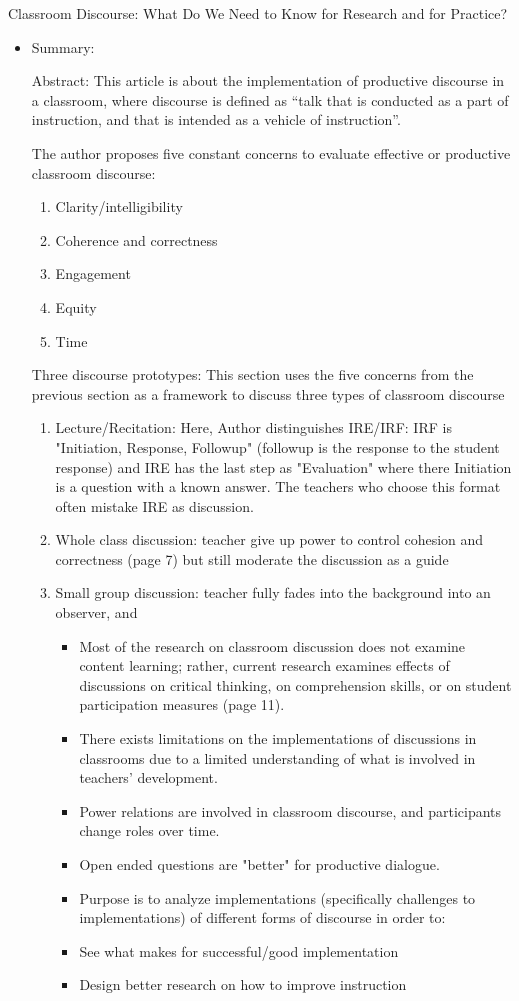 \documentclass{TC}
\begin{document}
Classroom Discourse: What Do We Need to Know for Research and for Practice? \parencite{oconnor_classroom_2017}
\begin{itemize}
\item Summary:

Abstract:
This article is about the implementation of productive discourse in a classroom, where discourse is defined as “talk that is conducted as a part of instruction, and that is intended as a vehicle of instruction”. 

The author proposes five constant concerns to evaluate effective or productive classroom discourse:
	\begin{enumerate}
	\item Clarity/intelligibility
	\item Coherence and correctness
	\item Engagement
	\item Equity
	\item Time
	\end{enumerate}
Three discourse prototypes: This section uses the five concerns from the previous section as a framework to discuss three types of classroom discourse

	\begin{enumerate}
	\item Lecture/Recitation: Here, Author distinguishes IRE/IRF: IRF is "Initiation, Response, Followup" (followup is the response to the student response) and IRE has the last step as "Evaluation" where there Initiation is a question with a known answer. The teachers who choose this format often mistake IRE as discussion. 
	\item Whole class discussion: teacher give up power to control cohesion and correctness (page 7) but still moderate the discussion as a guide
	\item Small group discussion: teacher fully fades into the background into an observer, and 
		\begin{itemize}
		\item Most of the research on classroom discussion does not examine content learning; rather, current research examines effects of discussions on critical thinking, on comprehension skills, or on student participation measures (page 11).  
		\item There exists limitations on the implementations of discussions in classrooms due to a limited understanding of what is involved in teachers' development.
		\item Power relations are involved in classroom discourse, and participants change roles over time. 
		\item Open ended questions are "better" for productive dialogue.
		\item Purpose is to analyze implementations (specifically challenges to implementations) of different forms of discourse in order to:
		\item See what makes for successful/good implementation
		\item Design better research on how to improve instruction
		\end{itemize}
	\end{enumerate}
	

\end{itemize}
\end{document}
